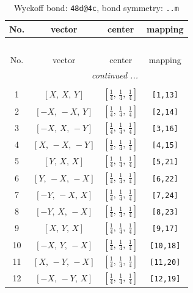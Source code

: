 \documentclass[fleqn,8pt]{jsarticle}
\begin{document}
\begin{longtable}{cccc}
\caption{Wyckoff bond: {\tt 48d@4c}, bond symmetry: {\tt ..m}}
 \\
 \hline \hline
No. & vector & center & mapping \\ \hline \endfirsthead

\multicolumn{3}{l}{\tablename\ \thetable{}} \\
 \hline \hline
No. & vector & center & mapping \\ \hline \endhead

 \hline \hline
\multicolumn{3}{r}{\footnotesize\it continued ...} \\ \endfoot

 \hline \hline
\multicolumn{3}{r}{} \\ \endlastfoot

1 & $\left[ X,\, X,\, Y \right]$ & $\left[ \frac{1}{4},\, \frac{1}{4},\, \frac{1}{4} \right]$ & {\tt [1,13]} \\ \hline
2 & $\left[ - X,\, - X,\, Y \right]$ & $\left[ \frac{1}{4},\, \frac{1}{4},\, \frac{1}{4} \right]$ & {\tt [2,14]} \\ \hline
3 & $\left[ - X,\, X,\, - Y \right]$ & $\left[ \frac{1}{4},\, \frac{1}{4},\, \frac{1}{4} \right]$ & {\tt [3,16]} \\ \hline
4 & $\left[ X,\, - X,\, - Y \right]$ & $\left[ \frac{1}{4},\, \frac{1}{4},\, \frac{1}{4} \right]$ & {\tt [4,15]} \\ \hline
5 & $\left[ Y,\, X,\, X \right]$ & $\left[ \frac{1}{4},\, \frac{1}{4},\, \frac{1}{4} \right]$ & {\tt [5,21]} \\ \hline
6 & $\left[ Y,\, - X,\, - X \right]$ & $\left[ \frac{1}{4},\, \frac{1}{4},\, \frac{1}{4} \right]$ & {\tt [6,22]} \\ \hline
7 & $\left[ - Y,\, - X,\, X \right]$ & $\left[ \frac{1}{4},\, \frac{1}{4},\, \frac{1}{4} \right]$ & {\tt [7,24]} \\ \hline
8 & $\left[ - Y,\, X,\, - X \right]$ & $\left[ \frac{1}{4},\, \frac{1}{4},\, \frac{1}{4} \right]$ & {\tt [8,23]} \\ \hline
9 & $\left[ X,\, Y,\, X \right]$ & $\left[ \frac{1}{4},\, \frac{1}{4},\, \frac{1}{4} \right]$ & {\tt [9,17]} \\ \hline
10 & $\left[ - X,\, Y,\, - X \right]$ & $\left[ \frac{1}{4},\, \frac{1}{4},\, \frac{1}{4} \right]$ & {\tt [10,18]} \\ \hline
11 & $\left[ X,\, - Y,\, - X \right]$ & $\left[ \frac{1}{4},\, \frac{1}{4},\, \frac{1}{4} \right]$ & {\tt [11,20]} \\ \hline
12 & $\left[ - X,\, - Y,\, X \right]$ & $\left[ \frac{1}{4},\, \frac{1}{4},\, \frac{1}{4} \right]$ & {\tt [12,19]} \\
\end{longtable}
\end{document}

